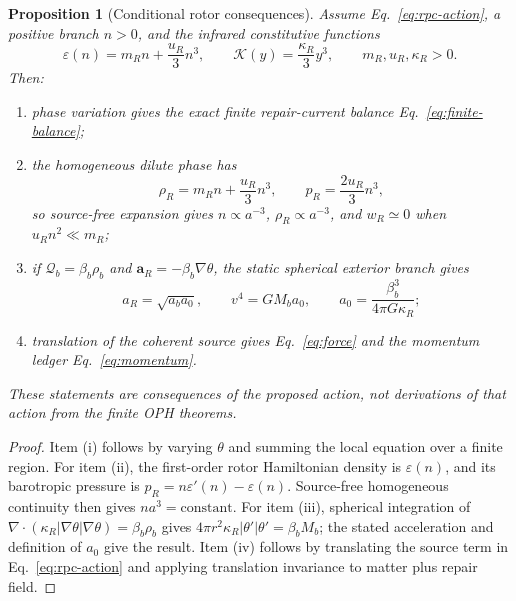 \documentclass[11pt]{article}
\numberwithin{equation}{section}
\newtheorem{proposition}[theorem]{Proposition}
\theoremstyle{remark}
\begin{document}
\begin{proposition}[Conditional rotor consequences]
\label{prop:rotor-consequences}
Assume Eq.~\eqref{eq:rpc-action}, a positive branch \(n>0\), and the infrared
constitutive functions
\begin{equation}
\varepsilon(n)=m_Rn+\frac{u_R}{3}n^3,
\qquad
\mathcal K(y)=\frac{\kappa_R}{3}y^3,
\qquad
m_R,u_R,\kappa_R>0.
\label{eq:rpc-constitutive}
\end{equation}
Then:
\begin{enumerate}[label=(\roman*),leftmargin=*]
\item phase variation gives the exact finite repair-current balance
Eq.~\eqref{eq:finite-balance};
\item the homogeneous dilute phase has
\begin{equation}
\rho_R=m_Rn+\frac{u_R}{3}n^3,
\qquad
p_R=\frac{2u_R}{3}n^3,
\end{equation}
so source-free expansion gives \(n\propto a^{-3}\),
\(\rho_R\propto a^{-3}\), and \(w_R\simeq0\) when
\(u_Rn^2\ll m_R\);
\item if \(\mathcal Q_b=\beta_b\rho_b\) and
\(\mathbf a_R=-\beta_b\nabla\theta\), the static spherical exterior branch
gives
\begin{equation}
a_R=\sqrt{a_ba_0},
\qquad
v^4=GM_ba_0,
\qquad
a_0=\frac{\beta_b^3}{4\pi G\kappa_R};
\end{equation}
\item translation of the coherent source gives
Eq.~\eqref{eq:force} and the momentum ledger
Eq.~\eqref{eq:momentum}.
\end{enumerate}
These statements are consequences of the proposed action, not derivations of
that action from the finite OPH theorems.
\end{proposition}

\begin{proof}
Item (i) follows by varying \(\theta\) and summing the local equation over a
finite region. For item (ii), the first-order rotor Hamiltonian density is
\(\varepsilon(n)\), and its barotropic pressure is
\(p_R=n\varepsilon'(n)-\varepsilon(n)\). Source-free homogeneous continuity
then gives \(n a^3=\mathrm{constant}\). For item (iii), spherical integration
of
\(\nabla\cdot(\kappa_R|\nabla\theta|\nabla\theta)=\beta_b\rho_b\)
gives
\(4\pi r^2\kappa_R|\theta'|\theta'=\beta_bM_b\); the stated acceleration and
definition of \(a_0\) give the result. Item (iv) follows by translating the
source term in Eq.~\eqref{eq:rpc-action} and applying translation invariance
to matter plus repair field.
\end{proof}
\end{document}
